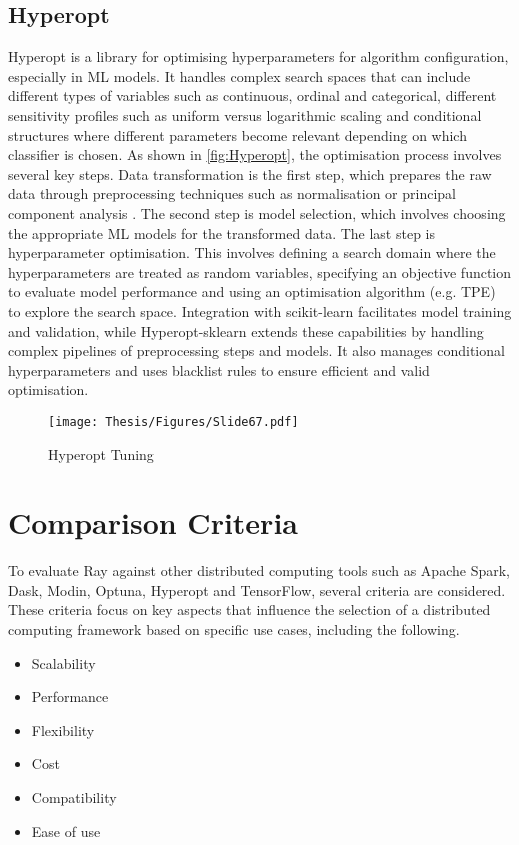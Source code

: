 \subsection{Hyperopt}

Hyperopt is a library for optimising hyperparameters for algorithm configuration, especially in ML models. It handles complex search spaces that can include different types of variables such as continuous, ordinal and categorical, different sensitivity profiles such as uniform versus logarithmic scaling and conditional structures where different parameters become relevant depending on which classifier is chosen. As shown in \autoref{fig:Hyperopt}, the optimisation process involves several key steps. Data transformation is the first step, which prepares the raw data through preprocessing techniques such as normalisation or principal component analysis . The second step is model selection, which involves choosing the appropriate ML models for the transformed data. The last step is hyperparameter optimisation. This involves defining a search domain where the hyperparameters are treated as random variables, specifying an objective function to evaluate model performance and using an optimisation algorithm (e.g. TPE) to explore the search space. Integration with scikit-learn facilitates model training and validation, while Hyperopt-sklearn extends these capabilities by handling complex pipelines of preprocessing steps and models. It also manages conditional hyperparameters and uses blacklist rules to ensure efficient and valid optimisation. \cite{komer2014hyperopt}


\begin{figure}[h]
\centering
\texttt{[image: Thesis/Figures/Slide67.pdf]}
\caption{\label{fig:Hyperopt}Hyperopt Tuning \cite{hyperopt_bayesian_optimization}}
\end{figure}


\section{Comparison Criteria}

To evaluate Ray against other distributed computing tools such as Apache Spark, Dask, Modin, Optuna, Hyperopt and TensorFlow, several criteria are considered. These criteria focus on key aspects that influence the selection of a distributed computing framework based on specific use cases, including the following.

\begin{itemize}
    \item Scalability
    \item Performance
    \item Flexibility
    \item Cost
    \item Compatibility
    \item Ease of use
    
\end{itemize}

